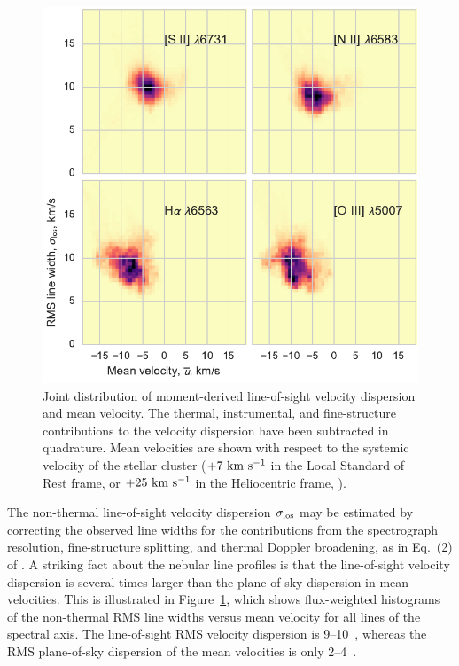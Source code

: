 \documentclass[useAMS,usenatbib]{mn2e}
\begin{document}
\begin{figure}
  \centering
  \includegraphics[width=\linewidth]{obs-combo-hist-vmean-sig}
  \caption{Joint distribution of moment-derived line-of-sight velocity
    dispersion and mean velocity.  The thermal, instrumental, and
    fine-structure contributions to the velocity dispersion have been
    subtracted in quadrature.  Mean velocities are shown with respect
    to the systemic velocity of the stellar cluster (\(+7~\mathrm{km\ s^{-1}}\) in
    the Local Standard of Rest frame, or \(+25~\mathrm{km\ s^{-1}}\) in the
    Heliocentric frame, \citealp{Tobin:2009a}).}
  \label{fig:observed-vmean-sigma}
\end{figure}
The non-thermal line-of-sight velocity dispersion 
\(\sigma_{\mathrm{los}}\)
may be estimated by
correcting the observed line widths for the contributions from the
spectrograph resolution, %
fine-structure splitting, %
and thermal Doppler broadening, 
as in Eq.~(2) of \citet{Garcia-Diaz:2008a}.  
A striking fact about the nebular line profiles is that
the line-of-sight velocity dispersion is several times larger than the
plane-of-sky dispersion in mean velocities.  This is illustrated in
Figure~\ref{fig:observed-vmean-sigma}, which shows flux-weighted
histograms of the non-thermal RMS line widths versus mean velocity for
all lines of the \citet{Garcia-Diaz:2008a} spectral axis.   The
line-of-sight RMS velocity dispersion is 9--10~\kms, whereas the RMS
plane-of-sky dispersion of the mean velocities is only 2--4~\kms.  
\end{document}
